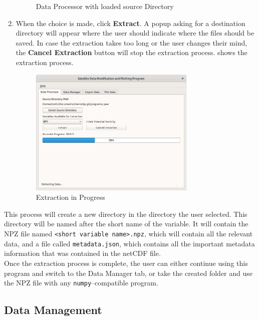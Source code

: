 \documentclass[../00_main.tex]{subfiles}
\begin{document}
\begin{enumerate}
\begin{figure}[H]
            \caption{Data Processor with loaded source Directory}
            \label{dp03}
        \end{figure}
    \item When the choice is made, click \textbf{Extract}. A popup asking
        for a destination directory will appear where the user should
        indicate where the files should be saved. In case the extraction
        takes too long or the user changes their mind, the \textbf{Cancel
        Extraction} button will stop the extraction process. 
        shows the extraction process.
        \begin{figure}[H]
            \center
            \includegraphics[width=0.75\textwidth]{../graphics/dp04}
            \caption{Extraction in Progress}
            \label{dp04}
        \end{figure}
\end{enumerate}
This process will create a new directory in the directory the user selected.
This directory will be named after the short name of the variable. It will
contain the NPZ file named \texttt{<short variable name>.npz}, which
will contain all the relevant data, and a file called
\texttt{metadata.json}, which contains all the important metadata information
that was contained in the netCDF file.\\ 
Once the extraction process is complete, the user can either continue using
this program and switch to the Data Manager tab, or take the created folder and
use the NPZ file with any \texttt{numpy}--compatible program.

\subsection{Data Management}
\end{document}
